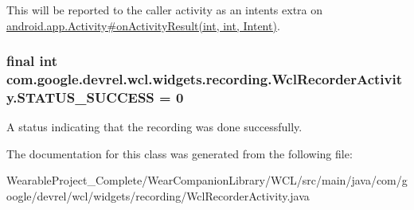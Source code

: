 This will be reported to the caller activity as an intent\textquotesingle{}s extra on \hyperlink{}{android.\+app.\+Activity\#on\+Activity\+Result(int, int, Intent)}. 
\subsubsection[{\texorpdfstring{S\+T\+A\+T\+U\+S\+\_\+\+S\+U\+C\+C\+E\+SS}{STATUS_SUCCESS}}]{\setlength{\rightskip}{0pt plus 5cm}final int com.\+google.\+devrel.\+wcl.\+widgets.\+recording.\+Wcl\+Recorder\+Activity.\+S\+T\+A\+T\+U\+S\+\_\+\+S\+U\+C\+C\+E\+SS = 0\hspace{0.3cm}{\ttfamily [static]}}\hypertarget{classcom_1_1google_1_1devrel_1_1wcl_1_1widgets_1_1recording_1_1WclRecorderActivity_a4631e92aa0ce773404a1acf457b6aff3}{}\label{classcom_1_1google_1_1devrel_1_1wcl_1_1widgets_1_1recording_1_1WclRecorderActivity_a4631e92aa0ce773404a1acf457b6aff3}
A status indicating that the recording was done successfully. 

The documentation for this class was generated from the following file\+:\begin{DoxyCompactItemize}
\item 
Wearable\+Project\+\_\+\+Complete/\+Wear\+Companion\+Library/\+W\+C\+L/src/main/java/com/google/devrel/wcl/widgets/recording/Wcl\+Recorder\+Activity.\+java\end{DoxyCompactItemize}
